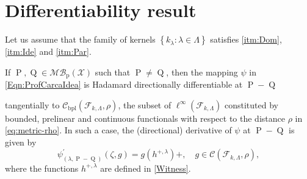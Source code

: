 \section{Differentiability result}
	\begin{Th}
		Let us assume that the family of kernels $\left\{k_{\lambda}:\lambda\in\Lambda\right\}$ satisfies \ref{itm:Dom}, \ref{itm:Ide} and \ref{itm:Par}.
		
		If $\operatorname{P},\operatorname{Q}\in\mathcal{MB}_{\operatorname{p}}(\mathcal{X})$ such that $\operatorname{P}\neq\operatorname{Q}$, then the mapping $\psi$ in \eqref{Eqn:ProfCarcaIdea} is Hadamard directionally differentiable at $\operatorname{P}-\operatorname{Q}$
		
		tangentially to $\mathcal{C}_{\operatorname{bpl}}\left(\mathcal{F}_{k,\Lambda},\rho\right)$, the subset of $\ell^{\infty}\left(\mathcal{F}_{k,\Lambda}\right)$ constituted by bounded, prelinear and continuous functionals with respect to the distance $\rho$ in \eqref{eq:metric-rho}. In such a case, the (directional) derivative of $\psi$ at $\operatorname{P}-\operatorname{Q}$ is given by
		\begin{equation}\label{Eqn:psi_prime}
			\psi_{(\lambda,\operatorname{P}-\operatorname{Q})}^{\prime}(\zeta,g)=g\left(h^{+,\lambda}\right)+,\quad g\in\mathcal{C}\left(\mathcal{F}_{k,\Lambda},\rho\right),
		\end{equation}
		where the functions $h^{+,\lambda}$ are defined in \eqref{Witness}.
	\end{Th}
